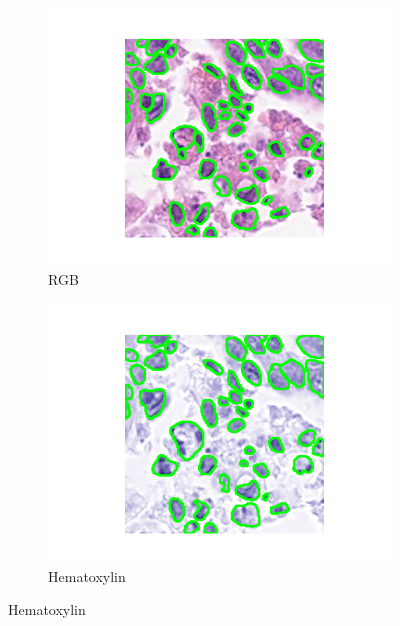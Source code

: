\documentclass[target=bach,aauheader=,style=]{thud}
\begin{document}
\begin{figure}[!htbp]
\begin{subfigure}{0.48\textwidth}
  \centering
  \includegraphics[width=\linewidth]{imgs/qualitative/worst/RGB/contour_img.png}
  \caption{RGB}
\end{subfigure}\hfill
\begin{subfigure}{0.48\textwidth}
  \centering
  \includegraphics[width=\linewidth]{imgs/qualitative/worst/HE/contour_img.png}
  \caption{Hematoxylin}
\end{subfigure}


\end{figure}
\end{document}
